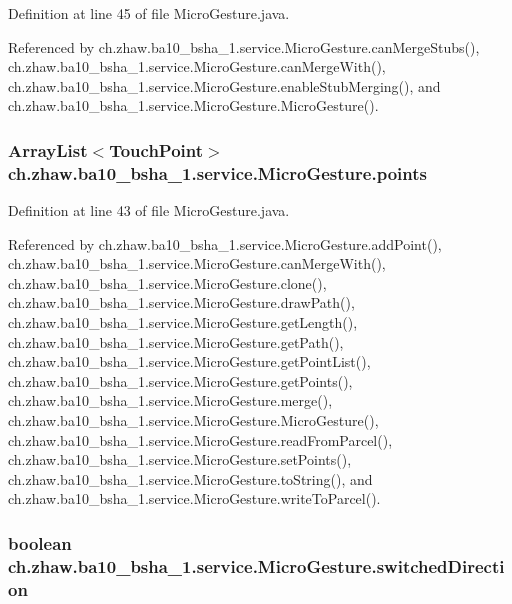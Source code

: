 Definition at line 45 of file MicroGesture.java.

Referenced by ch.zhaw.ba10\_\-bsha\_\-1.service.MicroGesture.canMergeStubs(), ch.zhaw.ba10\_\-bsha\_\-1.service.MicroGesture.canMergeWith(), ch.zhaw.ba10\_\-bsha\_\-1.service.MicroGesture.enableStubMerging(), and ch.zhaw.ba10\_\-bsha\_\-1.service.MicroGesture.MicroGesture().\hypertarget{classch_1_1zhaw_1_1ba10__bsha__1_1_1service_1_1MicroGesture_a3eb0c61e8503400680d21d305ca58356}{
\subsubsection[{points}]{\setlength{\rightskip}{0pt plus 5cm}ArrayList$<${\bf TouchPoint}$>$ {\bf ch.zhaw.ba10\_\-bsha\_\-1.service.MicroGesture.points}}}
\label{classch_1_1zhaw_1_1ba10__bsha__1_1_1service_1_1MicroGesture_a3eb0c61e8503400680d21d305ca58356}


Definition at line 43 of file MicroGesture.java.

Referenced by ch.zhaw.ba10\_\-bsha\_\-1.service.MicroGesture.addPoint(), ch.zhaw.ba10\_\-bsha\_\-1.service.MicroGesture.canMergeWith(), ch.zhaw.ba10\_\-bsha\_\-1.service.MicroGesture.clone(), ch.zhaw.ba10\_\-bsha\_\-1.service.MicroGesture.drawPath(), ch.zhaw.ba10\_\-bsha\_\-1.service.MicroGesture.getLength(), ch.zhaw.ba10\_\-bsha\_\-1.service.MicroGesture.getPath(), ch.zhaw.ba10\_\-bsha\_\-1.service.MicroGesture.getPointList(), ch.zhaw.ba10\_\-bsha\_\-1.service.MicroGesture.getPoints(), ch.zhaw.ba10\_\-bsha\_\-1.service.MicroGesture.merge(), ch.zhaw.ba10\_\-bsha\_\-1.service.MicroGesture.MicroGesture(), ch.zhaw.ba10\_\-bsha\_\-1.service.MicroGesture.readFromParcel(), ch.zhaw.ba10\_\-bsha\_\-1.service.MicroGesture.setPoints(), ch.zhaw.ba10\_\-bsha\_\-1.service.MicroGesture.toString(), and ch.zhaw.ba10\_\-bsha\_\-1.service.MicroGesture.writeToParcel().\hypertarget{classch_1_1zhaw_1_1ba10__bsha__1_1_1service_1_1MicroGesture_aaddd90c10ceefbedf0dc527d93989b84}{
\subsubsection[{switchedDirection}]{\setlength{\rightskip}{0pt plus 5cm}boolean {\bf ch.zhaw.ba10\_\-bsha\_\-1.service.MicroGesture.switchedDirection}}}
\label{classch_1_1zhaw_1_1ba10__bsha__1_1_1service_1_1MicroGesture_aaddd90c10ceefbedf0dc527d93989b84}


